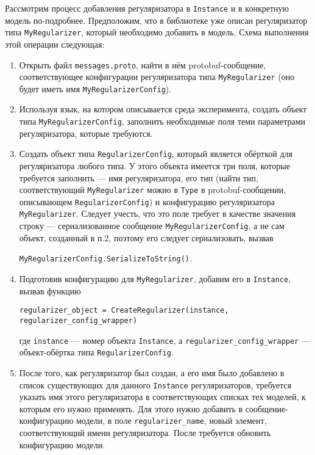 Рассмотрим процесс добавления регуляризатора в \verb'Instance' и в конкретную модель по-подробнее.  Предположим, что в библиотеке уже описан регуляризатор типа \verb'MyRegularizer', который необходимо добавить в модель. Схема выполнения этой операции следующая:
\begin{enumerate}
	\item Открыть файл \verb'messages.proto', найти в нём protobuf-сообщение, соответствующее конфигурации регуляризатора типа \verb'MyRegularizer' (оно будет иметь имя \verb'MyRegularizerConfig').
	
	\item Используя язык, на котором описывается среда эксперимента, создать объект типа \verb'MyRegularizerConfig', заполнить необходимые поля теми параметрами регуляризатора, которые требуются. 
	
	\item Создать объект типа \verb'RegularizerConfig', который является обёрткой для регуляризатора любого типа. У этого объекта имеется три поля, которые требуется заполнить --- имя регуляризатора, его тип (найти тип, соответствующий \verb'MyRegularizer' можно в \verb'Type' в protobuf-сообщении, описывающем \verb'RegularizerConfig') и конфигурацию регуляризатора \verb'MyRegularizer'. Следует учесть, что это поле требует в качестве значения строку --- сериализованное сообщение \verb'MyRegularizerConfig', а не сам объект, созданный в п.2, поэтому его следует сериализовать, вызвав 
	
	\vspace{10pt}
	\verb'MyRegularizerConfig.SerializeToString()'.
	\vspace{10pt}
	
	\item Подготовив конфигурацию для \verb'MyRegularizer', добавим его в \verb'Instance', вызвав функцию
	
	\vspace{10pt}
	\verb|regularizer_object = CreateRegularizer(instance, regularizer_config_wrapper)| 
	\vspace{10pt}
	
	где \verb'instance' --- номер объекта \verb'Instance', а \verb'regularizer_config_wrapper' --- объект-обёртка типа \verb'RegularizerConfig'.
	
	\item После того, как регуляризатор был создан, а его имя было добавлено в список существующих для данного \verb'Instance' регуляризаторов, требуется указать имя этого регуляризатора в соответствующих списках тех моделей, к которым его нужно применять. Для этого нужно добавить в сообщение-конфигурацию модели, в поле \verb'regularizer_name', новый элемент, соответствующий имени регуляризатора. После требуется обновить конфигурацию модели.
	

\end{enumerate}
